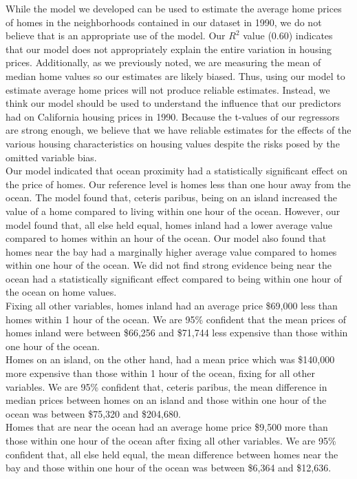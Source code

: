 \documentclass{article}
\begin{document}
While the model we developed can be used to estimate the average home prices of homes in the neighborhoods contained in our dataset in 1990, we do not believe that is an appropriate use of the model. Our $R^2$ value (0.60) indicates that our model does not appropriately explain the entire variation in housing prices. Additionally, as we previously noted, we are measuring the mean of median home values so our estimates are likely biased. Thus, using our model to estimate average home prices will not produce reliable estimates. Instead, we think our model should be used to understand the influence that our predictors had on California housing prices in 1990. Because the t-values of our regressors are strong enough, we believe that we have reliable estimates for the effects of the various housing characteristics on housing values despite the risks posed by the omitted variable bias. \\

Our model indicated that ocean proximity had a statistically significant effect on the price of homes. Our reference level is homes less than one hour away from the ocean. The model found that, ceteris paribus, being on an island increased the value of a home compared to living within one hour of the ocean. However, our model found that, all else held equal, homes inland had a lower average value compared to homes within an hour of the ocean. Our model also found that homes near the bay had a marginally higher average value compared to homes within one hour of the ocean. We did not find strong evidence being near the ocean had a statistically significant effect compared to being within one hour of the ocean on home values. \\

Fixing all other variables, homes inland had an average price \$69,000 less than homes within 1 hour of the ocean. We are 95\% confident that the mean prices of homes inland were between \$66,256 and \$71,744 less expensive than those within one hour of the ocean. \\

Homes on an island, on the other hand, had a mean price which was \$140,000 more expensive than those within 1 hour of the ocean, fixing for all other variables. We are 95\% confident that, ceteris paribus, the mean difference in median prices between homes on an island and those within one hour of the ocean was between \$75,320 and \$204,680. \\

Homes that are near the ocean had an average home price \$9,500 more than those within one hour of the ocean after fixing all other variables. We are 95\% confident that, all else held equal, the mean difference between homes near the bay and those within one hour of the ocean was between \$6,364 and \$12,636. \\
\end{document}
